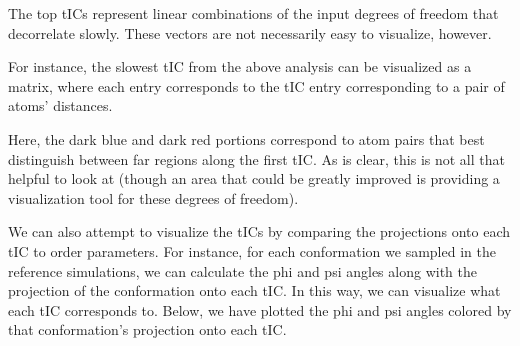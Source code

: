 \documentclass[12pt]{article}
\begin{document}
The top tICs represent linear combinations of the input degrees of freedom that decorrelate slowly. These vectors are not necessarily easy to visualize, however.

For instance, the slowest tIC from the above analysis can be visualized as a matrix, where each entry corresponds to the tIC entry corresponding to a pair of atoms' distances.
\begin{figure}[h!]
\end{figure} Here, the dark blue and dark red portions correspond to atom pairs that best distinguish between far regions along the first tIC. As is clear, this is not all that helpful to look at (though an area that could be greatly improved is providing a visualization tool for these degrees of freedom).

We can also attempt to visualize the tICs by comparing the projections onto each tIC to order parameters. For instance, for each conformation we sampled in the reference simulations, we can calculate the phi and psi angles along with the projection of the conformation onto each tIC. In this way, we can visualize what each tIC corresponds to. Below, we have plotted the phi and psi angles colored by that conformation's projection onto each tIC. 

\begin{figure}[h!]
\end{figure}
\end{document}
